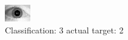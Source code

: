 \begin{figure}[h!]
\begin{center}
\includegraphics[width=0.60\columnwidth]{figures/ID1783_class_3_target_2.png}
\end{center}
\caption{ Classification: 3 actual target: 2}
\label{fig:ID1783_class_3_target_2}
\end{figure}
